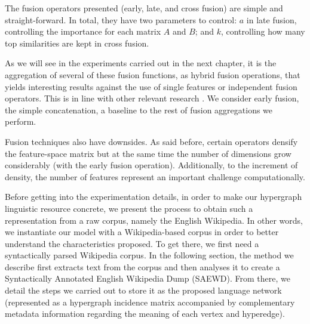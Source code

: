 \begin{enumerate}
	
	\end{enumerate}   


The fusion operators presented (early, late, and cross fusion) are simple and straight-forward. In total, they have two parameters to control: $a$ in late fusion, controlling the importance for each matrix $A$ and $B$; and $k$, controlling how many top similarities are kept in cross fusion.

As we will see in the experiments carried out in the next chapter, it is the aggregation of several of these fusion functions, as hybrid fusion operations, that yields interesting results against the use of single features or independent fusion operators. This is in line with other relevant research \cite{Ah-PineCC15}. We consider early fusion, the simple concatenation, a baseline to the rest of fusion aggregations we perform. 

Fusion techniques also have downsides. As said before, certain  operators densify the feature-space matrix but at the same time the number of dimensions grow considerably (with the early fusion operation). Additionally, to the increment of density, the number of features represent an important challenge computationally. 

Before getting into the experimentation details, in order to make our hypergraph linguistic resource concrete, we present the process to obtain such a representation from a raw corpus, namely the English Wikipedia. In other words, we instantiate our model with a Wikipedia-based corpus in order to better understand the characteristics proposed. To get there, we first need a syntactically parsed Wikipedia corpus. In the following section, the method we describe first extracts text from the corpus and then analyses it to create a Syntactically Annotated English Wikipedia Dump (SAEWD). From there, we detail the steps we carried out to store it as the proposed language network (represented as a hypergraph incidence matrix accompanied by complementary metadata information regarding the meaning of each vertex and hyperedge). 



